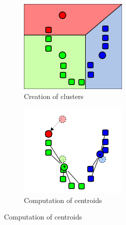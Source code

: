 \documentclass[conference,compsoc]{IEEEtran}
\begin{document}
\begin{figure}[htbp]
\begin{subfigure}{0.23\textwidth}
                \includegraphics[width=\textwidth]{kmean02.png}
                \caption{Creation of clusters}
                \label{fig:kmean02}
        \end{subfigure}
        \begin{subfigure}{0.23\textwidth}
                \includegraphics[width=\textwidth]{kmean03.png}
                \caption{Computation of centroids}
                \label{fig:kmean03}
        \end{subfigure}

\end{figure}
\end{document}
